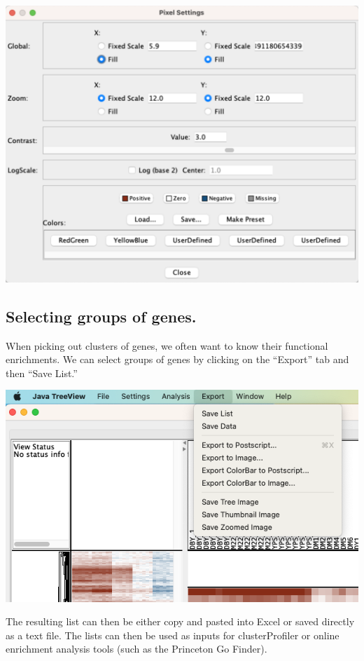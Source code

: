 \documentclass[
]{book}
\begin{document}
\includegraphics[width=19.22in]{figures/Pixel_Settings}

\hypertarget{selecting-groups-of-genes.}{%
\subsection{Selecting groups of genes.}\label{selecting-groups-of-genes.}}

When picking out clusters of genes, we often want to know their functional enrichments. We can select groups of genes by clicking on the ``Export'' tab and then ``Save List.''

\includegraphics[width=8.57in]{figures/Exporting_List}

The resulting list can then be either copy and pasted into Excel or saved directly as a text file. The lists can then be used as inputs for clusterProfiler or online enrichment analysis tools (such as the Princeton Go Finder).
\end{document}
